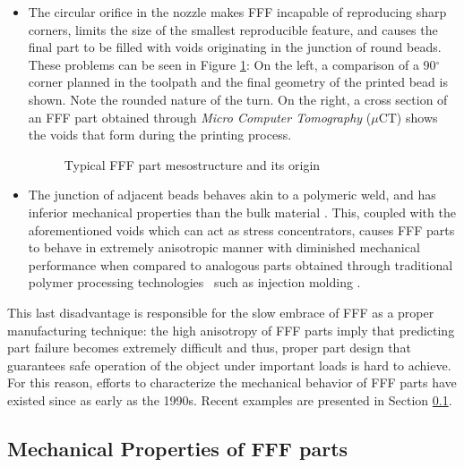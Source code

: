 \documentclass[main.tex]{subfiles}
\begin{document}
\begin{itemize}
	\item The circular orifice in the nozzle makes FFF incapable of reproducing sharp corners, limits the size of the smallest reproducible feature, and causes the final part to be filled with voids \textendash originating in the junction of round beads. These problems can be seen in Figure \ref{fig:FFFpartprob}: On the left, a comparison of a 90$^\circ$ corner planned in the toolpath and the final geometry of the printed bead is shown. Note the rounded nature of the turn. On the right, a cross section of an FFF part obtained through \emph{Micro Computer Tomography} ($\mu$CT) shows the voids that form during the printing process.
	\begin{figure}[h]
		\center
		\hfill
		\caption{Typical FFF part mesostructure and its origin} \label{fig:FFFpartprob}
	\end{figure}
	\item The junction of adjacent beads behaves akin to a polymeric weld, and has inferior mechanical properties than the bulk material \cite{Capote2017}. This, coupled with the aforementioned voids which can act as stress concentrators, causes FFF parts to behave in extremely anisotropic manner with diminished mechanical performance when compared to analogous parts obtained through traditional polymer processing technologies \textendash~such as injection molding \cite{Capote2017}.
\end{itemize}

This last disadvantage is responsible for the slow embrace of FFF as a proper manufacturing technique: the high anisotropy of FFF parts imply that predicting part failure becomes extremely difficult and thus, proper part design that guarantees safe operation of the object under important loads is hard to achieve.  For this reason, efforts to characterize the mechanical behavior of FFF parts have existed since as early as the 1990s. Recent examples are presented in Section \ref{ssec:mechPropFFF}.

\subsection{Mechanical Properties of FFF parts}\label{ssec:mechPropFFF}
\end{document}
